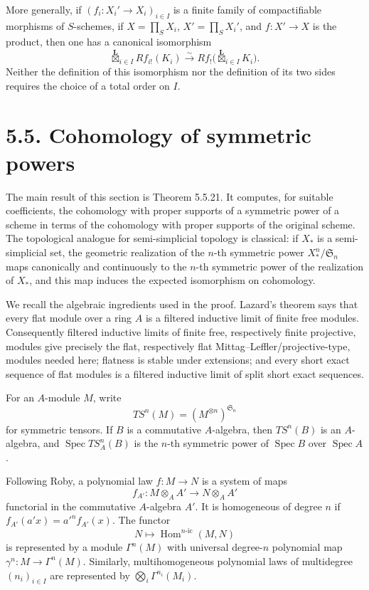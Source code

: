 \documentclass[12pt]{article}
\DeclareMathOperator{\Spec}{Spec}
\newcommand{\boxtimesL}{\mathbin{\overset{\mathbf L}{\boxtimes}}}
\begin{document}
More generally, if \((f_i:X_i'\to X_i)_{i\in I}\) is a finite family of compactifiable morphisms of \(S\)-schemes, if \(X=\prod_S X_i\), \(X'=\prod_S X_i'\), and \(f:X'\to X\) is the product, then one has a canonical isomorphism
\[
\boxtimesL_{i\in I}Rf_{i!}(K_i)
\xrightarrow{\sim}
Rf_!\bigl(\boxtimesL_{i\in I}K_i\bigr).
\]
Neither the definition of this isomorphism nor the definition of its two sides requires the choice of a total order on \(I\).

\section*{5.5. Cohomology of symmetric powers}

The main result of this section is Theorem 5.5.21. It computes, for suitable coefficients, the cohomology with proper supports of a symmetric power of a scheme in terms of the cohomology with proper supports of the original scheme. The topological analogue for semi-simplicial topology is classical: if \(X_*\) is a semi-simplicial set, the geometric realization of the \(n\)-th symmetric power \(X_*^n/\mathfrak S_n\) maps canonically and continuously to the \(n\)-th symmetric power of the realization of \(X_*\), and this map induces the expected isomorphism on cohomology.

We recall the algebraic ingredients used in the proof. Lazard's theorem says that every flat module over a ring \(A\) is a filtered inductive limit of finite free modules. Consequently filtered inductive limits of finite free, respectively finite projective, modules give precisely the flat, respectively flat Mittag--Leffler/projective-type, modules needed here; flatness is stable under extensions; and every short exact sequence of flat modules is a filtered inductive limit of split short exact sequences.

For an \(A\)-module \(M\), write
\[
TS^n(M)=(M^{\otimes n})^{\mathfrak S_n}
\]
for symmetric tensors. If \(B\) is a commutative \(A\)-algebra, then \(TS^n(B)\) is an \(A\)-algebra, and \(\Spec TS^n_A(B)\) is the \(n\)-th symmetric power of \(\Spec B\) over \(\Spec A\).

Following Roby, a polynomial law \(f:M\to N\) is a system of maps
\[
f_{A'}:M\otimes_AA'\longrightarrow N\otimes_AA'
\]
functorial in the commutative \(A\)-algebra \(A'\). It is homogeneous of degree \(n\) if \(f_{A'}(a'x)=a'^nf_{A'}(x)\). The functor
\[
N\longmapsto \operatorname{Hom}^{n\text{-ic}}(M,N)
\]
is represented by a module \(\Gamma^n(M)\) with universal degree-\(n\) polynomial map \(\gamma^n:M\to\Gamma^n(M)\). Similarly, multihomogeneous polynomial laws of multidegree \((n_i)_{i\in I}\) are represented by \(\bigotimes_i\Gamma^{n_i}(M_i)\).
\end{document}
